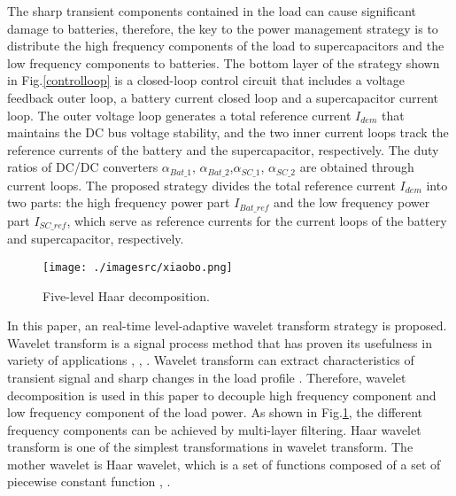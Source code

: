 \documentclass[energies,article,submit,moreauthors,pdftex,10pt,a4paper]{Definitions/mdpi}
\begin{document}
The sharp transient components contained in the load can cause significant damage to batteries, therefore, the key to the power management strategy is to distribute the high frequency components of the load to supercapacitors and the low frequency components to batteries.
The bottom layer of the strategy shown in Fig.\ref{controlloop} is a closed-loop control circuit that includes a voltage feedback outer loop, a battery current closed loop and a supercapacitor current loop. 
%
The outer voltage loop generates a total reference current $I_{dem}$ that maintains the DC bus voltage stability, and the two inner current loops track the reference currents of the battery and the supercapacitor, respectively. 
%
The duty ratios of DC/DC converters  $\alpha_{Bat\_1}$, $\alpha_{Bat\_2}$,$\alpha_{SC\_1}$, $\alpha_{SC\_2}$ are obtained through current loops.
%
The proposed strategy divides the total reference current $I_{dem}$ into two parts: the high frequency power part $I_{Bat\_ref}$ and the low frequency power part $I_{SC\_ref}$, which serve as reference currents for the current loops of the battery and supercapacitor, respectively.

\begin{figure}[ht]
\centering
\texttt{[image: ./imagesrc/xiaobo.png]}
\caption{Five-level Haar decomposition.}
\label{xiaobo}
\end{figure}

In this paper,  an real-time level-adaptive wavelet transform strategy is proposed.
Wavelet transform is a signal process method that has proven its usefulness in variety of applications \cite{IEEEhowto:wavelet3}, \cite{IEEEhowto:wavelet4}, \cite{IEEEhowto:wavelet1}. Wavelet transform can extract characteristics of transient signal and sharp changes in the load profile \cite{IEEEhowto:wavelet2}. 
Therefore, wavelet decomposition is used in this paper to decouple high frequency component and low frequency component of the load power. As shown in Fig.\ref{xiaobo}, the different frequency components can be achieved by multi-layer filtering.
Haar wavelet transform is one of the simplest transformations in wavelet transform. The mother wavelet is Haar wavelet, which is a set of functions composed of a set of piecewise constant function \cite{IEEEhowto:wavelet5}, \cite{IEEEhowto:wavelet6}.
\end{document}
